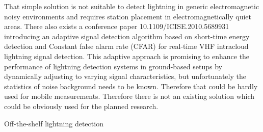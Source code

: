 That simple solution is not suitable to detect lightning in generic electromagnetic noisy environments and requires station placement in electromagnetically quiet areas. There also exists a conference paper 10.1109/ICISE.2010.5689931 introducing an adaptive signal detection algorithm based on short-time energy detection and Constant false alarm rate (CFAR) for real-time VHF intracloud lightning signal detection. This adaptive approach is promising to enhance the performance of lightning detection systems in ground-based setups by dynamically adjusting to varying signal characteristics, but unfortunately the statistics of noise background needs to be known. Therefore that could be hardly used for mobile measurements. Therefore there is not an existing solution which could be obviously used for the planned research.

\sec Off-the-shelf lightning detection

